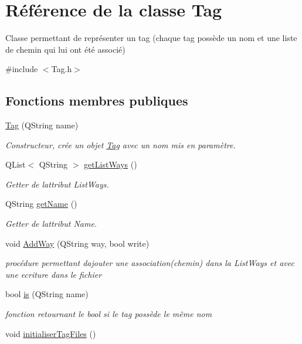 \hypertarget{class_tag}{}\section{Référence de la classe Tag}
\label{class_tag}


Classe permettant de représenter un tag (chaque tag possède un nom et une liste de chemin qui lui ont été associé)  




{\ttfamily \#include $<$Tag.\+h$>$}

\subsection*{Fonctions membres publiques}
\begin{DoxyCompactItemize}
\item 
\hyperlink{class_tag_a1dc354cd81ef646b6d1a88f8d792acab}{Tag} (Q\+String name)
\begin{DoxyCompactList}\small\item\em Constructeur, crée un objet \hyperlink{class_tag}{Tag} avec un nom mis en paramètre. \end{DoxyCompactList}\item 
Q\+List$<$ Q\+String $>$ \hyperlink{class_tag_ae59f1dfea121805d056982fb4fc256a3}{get\+List\+Ways} ()
\begin{DoxyCompactList}\small\item\em Getter de l\textquotesingle{}attribut List\+Ways. \end{DoxyCompactList}\item 
Q\+String \hyperlink{class_tag_a0aa1b1560628e5f2ba0ac2782fe1f6a2}{get\+Name} ()
\begin{DoxyCompactList}\small\item\em Getter de l\textquotesingle{}attribut Name. \end{DoxyCompactList}\item 
void \hyperlink{class_tag_a6e01670a53e191a0aa8dbd19e553ae17}{Add\+Way} (Q\+String way, bool write)
\begin{DoxyCompactList}\small\item\em procédure permettant d\textquotesingle{}ajouter une association(chemin) dans la List\+Ways et avec une ecriture dans le fichier \end{DoxyCompactList}\item 
bool \hyperlink{class_tag_aef29fdee7946c77e1458344b6f5caae0}{is} (Q\+String name)
\begin{DoxyCompactList}\small\item\em fonction retournant le bool si le tag possède le même nom \end{DoxyCompactList}\item 
void \hyperlink{class_tag_a78f2b199c0dfddf91155c2c310d7b9b7}{initialiser\+Tag\+Files} ()\hypertarget{class_tag_a78f2b199c0dfddf91155c2c310d7b9b7}{}\label{class_tag_a78f2b199c0dfddf91155c2c310d7b9b7}


\end{DoxyCompactItemize}
